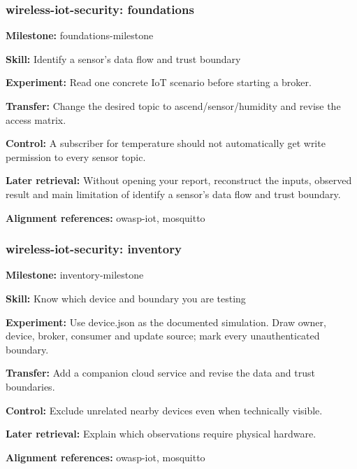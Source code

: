 \subsubsection{wireless-iot-security: foundations}
\noindent\textbf{Milestone:} foundations-milestone\par
\noindent\textbf{Skill:} Identify a sensor’s data flow and trust boundary\par
\noindent\textbf{Experiment:} Read one concrete IoT scenario before starting a broker.\par
\noindent\textbf{Transfer:} Change the desired topic to ascend/sensor/humidity and revise the access matrix.\par
\noindent\textbf{Control:} A subscriber for temperature should not automatically get write permission to every sensor topic.\par
\noindent\textbf{Later retrieval:} Without opening your report, reconstruct the inputs, observed result and main limitation of identify a sensor’s data flow and trust boundary.\par
\noindent\textbf{Alignment references:} owasp-iot, mosquitto\par
\subsubsection{wireless-iot-security: inventory}
\noindent\textbf{Milestone:} inventory-milestone\par
\noindent\textbf{Skill:} Know which device and boundary you are testing\par
\noindent\textbf{Experiment:} Use device.json as the documented simulation. Draw owner, device, broker, consumer and update source; mark every unauthenticated boundary.\par
\noindent\textbf{Transfer:} Add a companion cloud service and revise the data and trust boundaries.\par
\noindent\textbf{Control:} Exclude unrelated nearby devices even when technically visible.\par
\noindent\textbf{Later retrieval:} Explain which observations require physical hardware.\par
\noindent\textbf{Alignment references:} owasp-iot, mosquitto\par
